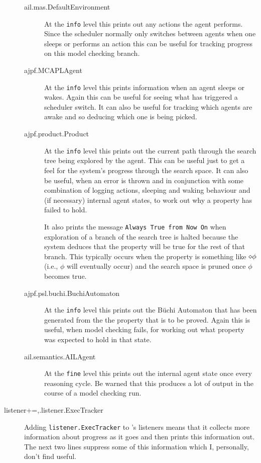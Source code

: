 \begin{sloppypar}
\begin{description}
\begin{description}
\item[ail.mas.DefaultEnvironment] At the \texttt{info} level this prints out any actions the agent performs.  Since the scheduler normally only switches between agents when one sleeps or performs an action this can be useful for tracking progress on this model checking branch.
\item[ajpf.MCAPLAgent] At the \texttt{info} level this prints information when an agent sleeps or wakes.  Again this can be useful for seeing what has triggered a scheduler switch.  It can also be useful for tracking which agents are awake and so deducing which one is being picked.
\item[ajpf.product.Product] At the \texttt{info} level this prints out the current path through the search tree being explored by the agent.  This can be useful just to get a feel for the system's progress through the search space.  It can also be useful, when an error is thrown and in conjunction with some combination of logging actions, sleeping and waking behaviour and (if necessary) internal agent states, to work out why a property has failed to hold.

It also prints the message \texttt{Always True from Now On} when exploration of a branch of the search tree is halted because the system deduces that the property will be true for the rest of that branch.  This typically occurs when the property is something like $\diamond \phi$ (i.e., $\phi$ will eventually occur) and the search space is pruned once $\phi$ becomes true.
\item[ajpf.psl.buchi.BuchiAutomaton] At the \texttt{info} level this prints out the B\"{u}chi Automaton that has been generated from the the property that is to be proved.  Again this is useful, when model checking fails, for working out what property was expected to hold in that state.
\item[ail.semantics.AILAgent] At the \texttt{fine} level this prints out the internal agent state once every reasoning cycle.  Be warned that this produces a lot of output in the course of a model checking run.
\end{description}
\item[listener+=,.listener.ExecTracker] Adding \texttt{listener.ExecTracker} to \jpf's listeners means that it collects more information about progress as it goes and then prints this information out.  The next two lines suppress some of this information which I, personally, don't find  useful. 
\end{description}
\end{sloppypar}

